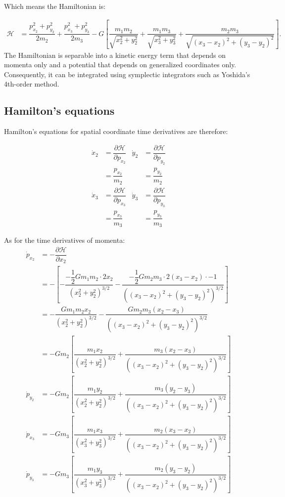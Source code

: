 \documentclass[12pt,a4paper,portrait]{article}
\begin{document}
	Which means the Hamiltonian is:
	
	\begin{align*}
		\mathcal{H} &= \dfrac{p_{x_2}^2 + p_{y_2}^2}{2m_2} + \dfrac{p_{x_3}^2 + p_{y_3}^2}{2m_3} -G\left[\dfrac{m_1m_2}{\sqrt{x_2^2+y_2^2}} + \dfrac{m_1 m_3}{\sqrt{x_3^2+y_3^2}} + \dfrac{m_2 m_3}{\sqrt{(x_3-x_2)^2+(y_3-y_2)^2}}\right].
	\end{align*}
	The Hamiltonian is separable into a kinetic energy term that depends on momenta only and a potential that depends on generalized coordinates only. Consequently, it can be integrated using symplectic integrators such as Yoshida's 4th-order method. 
	
	\subsection{Hamilton's equations}
	Hamilton's equations for spatial coordinate time derivatives are therefore:
	
	\begin{align*}
		\dot{x}_2 &= \dfrac{\partial \mathcal{H}}{\partial p_{x_2}} & \dot{y}_2 &= \dfrac{\partial \mathcal{H}}{\partial p_{y_2}} \\
		&= \dfrac{p_{x_2}}{m_2} & &= \dfrac{p_{y_2}}{m_2} \\
		\dot{x}_3 &= \dfrac{\partial \mathcal{H}}{\partial p_{x_3}} & \dot{y}_3 &= \dfrac{\partial \mathcal{H}}{\partial p_{y_3}} \\
		&= \dfrac{p_{x_3}}{m_3} & &= \dfrac{p_{y_3}}{m_3}
	\end{align*}
	
	As for the time derivatives of momenta:
	\begin{align*}
		\dot{p}_{x_2} &= -\dfrac{\partial \mathcal{H}}{\partial x_2} \\
		&= -\left[-\dfrac{-\dfrac{1}{2}Gm_1m_2 \cdot 2x_2}{(x_2^2+y_2^2)^{3/2}} - \dfrac{-\dfrac{1}{2}Gm_2m_3 \cdot 2(x_3-x_2)\cdot -1}{((x_3-x_2)^2+(y_3-y_2)^2)^{3/2}}\right] \\
		&= -\dfrac{Gm_1m_2x_2}{(x_2^2+y_2^2)^{3/2}} - \dfrac{Gm_2m_3(x_2-x_3)}{((x_3-x_2)^2+(y_3-y_2)^2)^{3/2}} \\
		&= -Gm_2\left[\dfrac{m_1x_2}{(x_2^2+y_2^2)^{3/2}} + \dfrac{m_3(x_2-x_3)}{((x_3-x_2)^2+(y_3-y_2)^2)^{3/2}}\right]\\
		\dot{p}_{y_2} &= -Gm_2\left[\dfrac{m_1y_2}{(x_2^2+y_2^2)^{3/2}} + \dfrac{m_3(y_2-y_3)}{((x_3-x_2)^2+(y_3-y_2)^2)^{3/2}}\right]\\
		\dot{p}_{x_3} &= -Gm_3\left[\dfrac{m_1x_3}{(x_3^2+y_3^2)^{3/2}} + \dfrac{m_2(x_3-x_2)}{((x_3-x_2)^2+(y_3-y_2)^2)^{3/2}}\right]\\
		\dot{p}_{y_3} &= -Gm_3\left[\dfrac{m_1y_3}{(x_3^2+y_3^2)^{3/2}} + \dfrac{m_2(y_3-y_2)}{((x_3-x_2)^2+(y_3-y_2)^2)^{3/2}}\right]
	\end{align*}
	
\end{document}
